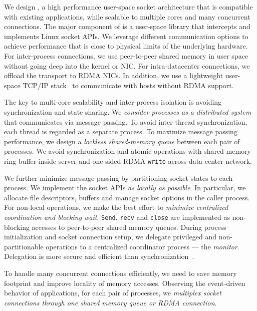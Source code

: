 
We design \sys{}, a high performance user-space socket architecture that is compatible with existing applications, while scalable to multiple cores and many concurrent connections. The major component of \sys{} is a user-space library \libipc{} that intercepts and implements Linux socket APIs. We leverage different communication options to achieve performance that is close to physical limits of the underlying hardware. For inter-process connections, we use peer-to-peer shared memory in user space without going deep into the kernel or NIC. For intra-datacenter connections, we offload the transport to RDMA NICs. In addition, we use a lightweight user-space TCP/IP stack~\cite{dunkels2001design} to communicate with hosts without RDMA support.


The key to multi-core scalability and inter-process isolation is avoiding synchronization and state sharing. We \textit{consider processes as a distributed system} that communicates via message passing. To avoid inter-thread synchronization, each thread is regarded as a separate process. To maximize message passing performance, we design a \textit{lockless shared-memory queue} between each pair of processes. We avoid synchronization and atomic operations with shared-memory ring buffer inside server and one-sided RDMA \texttt{write} across data center network.

We further minimize message passing by partitioning socket states to each process. We implement the socket APIs \textit{as locally as possible}. In particular, we allocate file descriptors, buffers and manage socket options in the caller process. For non-local operations, we make the best effort to \textit{minimize centralized coordination and blocking wait}. \texttt{Send}, \texttt{recv} and \texttt{close} are implemented as non-blocking accesses to peer-to-peer shared memory queues. During process initialization and socket connection setup, we delegate privileged and non-partitionable operations to a centralized coordinator process --- the \textit{monitor}. Delegation is more secure and efficient than synchronization~\cite{roghanchi2017ffwd}.

To handle many concurrent connections efficiently, we need to save memory footprint and improve locality of memory accesses. Observing the event-driven behavior of applications, for each pair of processes, we \textit{multiplex socket connections through one shared memory queue or RDMA connection}. %

